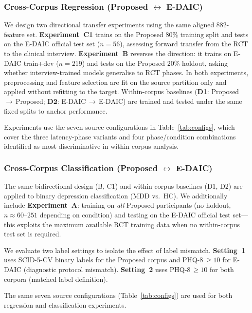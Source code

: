 \documentclass[sigconf]{acmart}
\begin{document}
\subsubsection{Cross-Corpus Regression (Proposed $\leftrightarrow$ E-DAIC)}
\label{sec:cross}

We design two directional transfer experiments using the same aligned 882-feature set.
\textbf{Experiment~C1} trains on the Proposed 80\% training split and tests on the
E-DAIC official test set ($n=56$), assessing forward transfer from the RCT to the
clinical interview.
\textbf{Experiment~B} reverses the direction: it trains on E-DAIC train+dev ($n=219$)
and tests on the Proposed 20\% holdout, asking whether interview-trained models
generalise to RCT phases.
In both experiments, preprocessing and feature selection are fit on the source partition
only and applied without refitting to the target.
Within-corpus baselines (\textbf{D1}: Proposed\,$\to$\,Proposed; \textbf{D2}: E-DAIC\,$\to$\,E-DAIC)
are trained and tested under the same fixed splits to anchor performance.

Experiments use the seven source configurations in Table~\ref{tab:configs}, which cover
the three latency-phase variants and four phase/condition combinations identified as
most discriminative in within-corpus analysis.

\subsubsection{Cross-Corpus Classification (Proposed $\leftrightarrow$ E-DAIC)}
\label{sec:cross_cls}

The same bidirectional design (B, C1) and within-corpus baselines (D1, D2) are applied
to binary depression classification (MDD vs.\ HC).
We additionally include \textbf{Experiment~A}: training on \emph{all} Proposed
participants (no holdout, $n \approx 60$--$251$ depending on condition) and testing on
the E-DAIC official test set---this exploits the maximum available RCT training data
when no within-corpus test set is required.

We evaluate two label settings to isolate the effect of label mismatch.
\textbf{Setting~1} uses SCID-5-CV binary labels for the Proposed corpus and PHQ-8\,$\geq 10$
for E-DAIC (diagnostic protocol mismatch).
\textbf{Setting~2} uses PHQ-8\,$\geq 10$ for both corpora (matched label definition).

The same seven source configurations (Table~\ref{tab:configs}) are used for both
regression and classification experiments.
\end{document}
